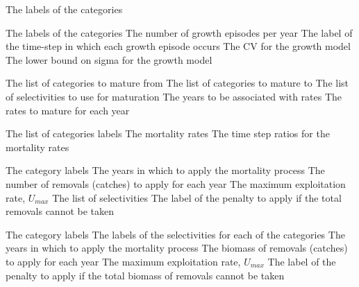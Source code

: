 \par\textbf{}\par
{} {The labels of the categories}

\par\textbf{}\par
{} {The labels of the categories}
 {The number of growth episodes per year}
 {The label of the time-step in which each growth episode occurs}
 {The CV for the growth model}
 {The lower bound on sigma for the growth model}

\par\textbf{}\par
{} {The list of categories to mature from}
 {The list of categories to mature to}
 {The list of selectivities to use for maturation}
 {The years to be associated with rates}
 {The rates to mature for each year}

\par\textbf{}\par
{} {The list of categories labels}
 {The mortality rates}
 {The time step ratios for the mortality rates}

\par\textbf{}\par
{} {The category labels}
 {The years in which to apply the mortality process}
 {The number of removals (catches) to apply for each year}
 {The maximum exploitation rate, $U_{max}$}
 {The list of selectivities}
 {The label of the penalty to apply if the total removals cannot be taken}

\par\textbf{}\par
{} {The category labels}
 {The labels of the selectivities for each of the categories}
 {The years in which to apply the mortality process}
 {The biomass of removals (catches) to apply for each year}
 {The maximum exploitation rate, $U_{max}$}
 {The label of the penalty to apply if the total biomass of removals cannot be taken}

